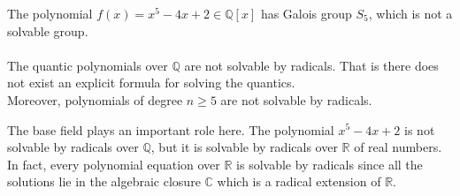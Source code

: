 The polynomial \(f(x)=x^5-4x+2 \in \mathbb{Q}[x]\) has Galois group \(S_5\), which is not a solvable group. \\ \\
The quantic polynomials over \(\mathbb{Q}\) are not solvable by radicals. That is there does not exist an explicit formula for solving the quantics. \\
Moreover, polynomials of degree \(n \geq 5\) are not solvable by radicals.

\begin{remark}
The base field plays an important role here. The polynomial \(x^5-4x+2\) is not solvable by radicals over \(\mathbb{Q}\), but it is solvable by radicals over \(\mathbb{R}\) of real numbers. In fact, every polynomial equation over \(\mathbb{R}\) is solvable by radicals since all the solutions lie in the algebraic closure \(\mathbb{C}\) which is a radical extension of \(\mathbb{R}\).
\end{remark}

